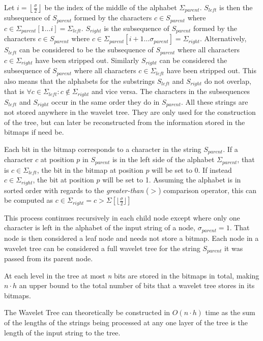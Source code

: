 Let $i = \left\lfloor\frac{\sigma}{2}\right\rfloor$ be the index of the middle of the alphabet $\Sigma_{parent}$.
$S_{left}$ is then the subsequence of $S_{parent}$ formed by the characters $c \in S_{parent}$ where $c \in \Sigma_{parent}[1 \ldots i] = \Sigma_{left}$.
$S_{right}$ is the subsequence of $S_{parent}$ formed by the characters $c \in S_{parent}$ where $c \in \Sigma_{parent}[i+1 \ldots \sigma_{parent}] = \Sigma_{right}$.
Alternatively, $S_{left}$ can be considered to be the subsequence of $S_{parent}$ where all characters $c \in \Sigma_{right}$ have been stripped out. Similarly $S_{right}$ can be considered the subsequence of $S_{parent}$ where all characters $c \in \Sigma_{left}$ have been stripped out.
This also means that the alphabets for the substrings $S_{left}$ and $S_{right}$ do not overlap, that is $\forall c \in \Sigma_{left}: c \notin \Sigma_{right}$ and vice versa.
The characters in the subsequences $S_{left}$ and $S_{right}$ occur in the same order they do in $S_{parent}$.
All these strings are not stored anywhere in the wavelet tree.
They are only used for the construction of the tree, but can later be reconstructed from the information stored in the bitmaps if need be.

Each bit in the bitmap corresponds to a character in the string $S_{parent}$.
If a character $c$ at position $p$ in $S_{parent}$ is in the left side of the alphabet $\Sigma_{parent}$, that is $c \in \Sigma_{left}$, the bit in the bitmap at position $p$ will be set to 0.
If instead $c \in \Sigma_{right}$, the bit at position $p$ will be set to 1.
Assuming the alphabet is in sorted order with regards to the \textit{greater-than} ($>$) comparison operator, this can be computed as $c \in \Sigma_{right} = c > \Sigma[\lfloor\frac{\sigma}{2}\rfloor]$

This process continues recursively in each child node except where only one character is left in the alphabet of the input string of a node, $\sigma_{parent} = 1$.
That node is then considered a leaf node and needs not store a bitmap.
Each node in a wavelet tree can be considered a full wavelet tree for the string $S_{parent}$ it was passed from its parent node.

At each level in the tree at most \textit{n} bits are stored in the bitmaps in total, making $n \cdot h$ an upper bound to the total number of bits that a wavelet tree stores in its bitmaps.

The Wavelet Tree can theoretically be constructed in $O(n \cdot h)$ time as the sum of the lengths of the strings being processed at any one layer of the tree is the length of the input string to the tree.

